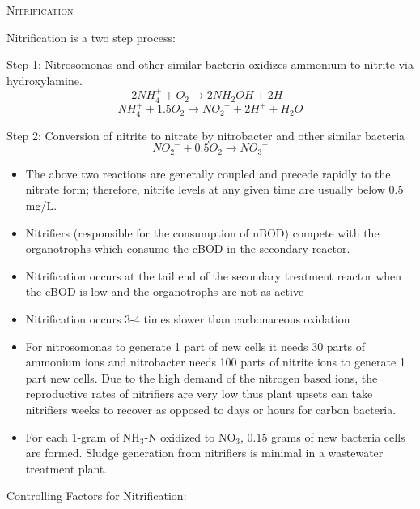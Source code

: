 \noindent\textsc{{Nitrification}}%

			\noindent Nitrification is a two step process:
			
			Step 1:  Nitrosomonas and other similar bacteria oxidizes ammonium to nitrite via hydroxylamine.
			$$2NH_4^{+} + O_2 \rightarrow 2NH_2OH + 2H^{+}$$
			$$NH_4^{+} + 1.5 O_2 \rightarrow NO_2^{\enspace -} + 2H^{+}+ H_2O$$
					 
			Step 2:  Conversion of nitrite to nitrate by nitrobacter and other similar bacteria
			$$NO_2^{\enspace -} + 0.5O_2 \rightarrow NO_3^{\enspace -}$$

			\begin{itemize}
				\item The above two reactions are generally coupled and precede rapidly to the nitrate form; therefore, nitrite levels at any given time are usually below 0.5 mg/L.
				\item Nitrifiers (responsible for the consumption of nBOD) compete with the organotrophs which consume the cBOD in the secondary reactor.  
				\item Nitrification occurs at the tail end of the secondary treatment reactor when the cBOD is low and the organotrophs are not as active
				\item Nitrification occurs 3-4 times slower than carbonaceous oxidation
				\item For nitrosomonas to generate 1 part of new cells it needs 30 parts of ammonium ions and nitrobacter needs 100 parts of nitrite ions to generate 1 part new cells.  Due to the high demand of the nitrogen based ions, the reproductive rates of nitrifiers are very low thus plant upsets can take nitrifiers weeks to recover as opposed to days or hours for carbon bacteria.  
				\item For each 1-gram of NH$_3$-N oxidized to NO$_3$, 0.15 grams of new bacteria cells are formed.  Sludge generation from nitrifiers is minimal in a wastewater treatment plant.
			\end{itemize}
				Controlling Factors for Nitrification:
